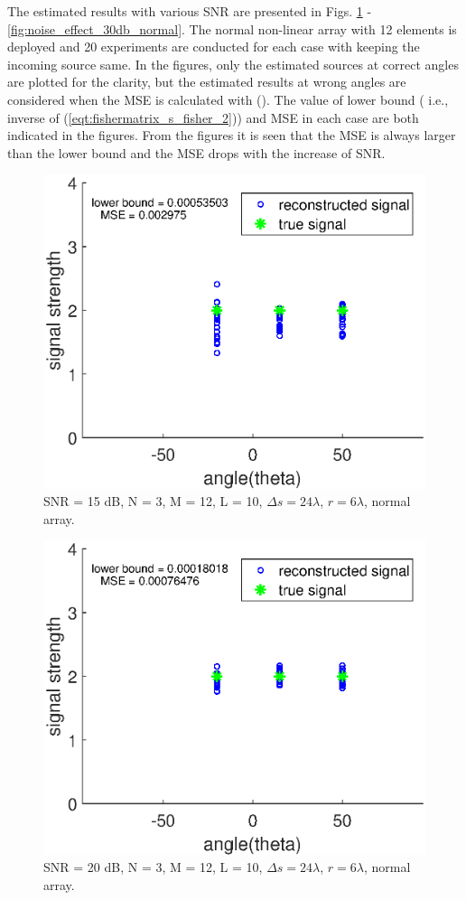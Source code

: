 \documentclass[proposal]{umthesis}          %
\begin{document}
The estimated results with various SNR are presented in Figs. \ref{fig:noise_effect_15db_normal} - \ref{fig:noise_effect_30db_normal}.
The normal non-linear array with 12 elements is deployed and 20 experiments are conducted for each case with keeping the incoming source same. In the figures, only the estimated sources at correct angles are plotted for the clarity, but the estimated results at wrong angles are considered when the MSE is calculated with (). 
The value of lower bound ( i.e., inverse of (\ref{eqt:fishermatrix_s_fisher_2})) and MSE in each case are both indicated in the figures. From the figures it is seen that the MSE is always larger than the lower bound and the MSE drops with the increase of SNR.  


\begin{figure}[H]
	\centering
	\includegraphics[width=0.6\columnwidth]{./results/noise_effect_15db_normal}
	\caption{SNR = 15 dB, N = 3, M = 12, L = 10, $\Delta s = 24 \lambda$, $r = 6\lambda$, normal array.}
	\label{fig:noise_effect_15db_normal}
\end{figure}

\begin{figure}[H]
	\centering
	\includegraphics[width=0.6\columnwidth]{./results/noise_effect_20db_normal}
	\caption{SNR = 20 dB, N = 3, M = 12, L = 10, $\Delta s = 24 \lambda$, $r = 6\lambda$, normal array.}
	\label{fig:noise_effect_20db_normal}
\end{figure}
\end{document}

